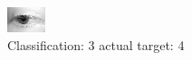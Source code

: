 \begin{figure}[h!]
\begin{center}
\includegraphics[width=0.60\columnwidth]{figures/ID2566_class_3_target_4.png}
\end{center}
\caption{ Classification: 3 actual target: 4}
\label{fig:ID2566_class_3_target_4}
\end{figure}
